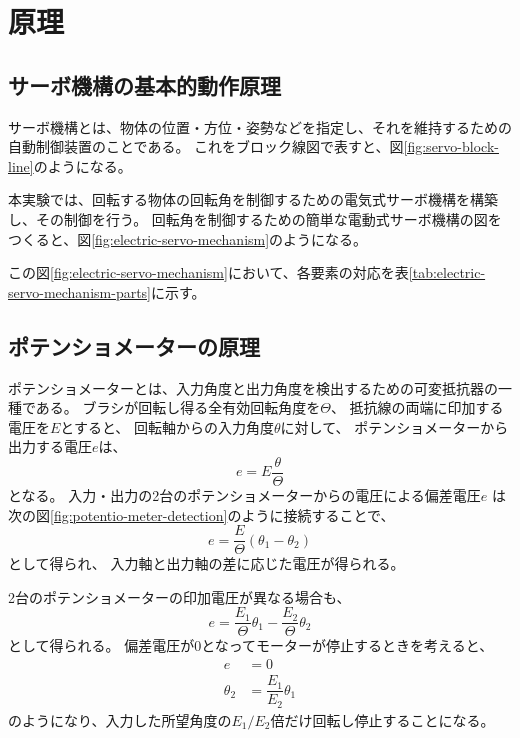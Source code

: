 \documentclass[../../../main]{subfiles}
\begin{document}
\section{原理}\label{sec:principle}

\subsection{サーボ機構の基本的動作原理}

サーボ機構とは、物体の位置・方位・姿勢などを指定し、それを維持するための自動制御装置のことである。
これをブロック線図で表すと、図\ref{fig:servo-block-line}のようになる。

本実験では、回転する物体の回転角を制御するための電気式サーボ機構を構築し、その制御を行う。
回転角を制御するための簡単な電動式サーボ機構の図をつくると、図\ref{fig:electric-servo-mechanism}のようになる。

この図\ref{fig:electric-servo-mechanism}において、各要素の対応を表\ref{tab:electric-servo-mechanism-parts}に示す。



\subsection{ポテンショメーターの原理}
ポテンショメーターとは、入力角度と出力角度を検出するための可変抵抗器の一種である。
ブラシが回転し得る全有効回転角度を$\Theta$、
抵抗線の両端に印加する電圧を$E$とすると、
回転軸からの入力角度$\theta$に対して、
ポテンショメーターから出力する電圧$e$は、
\begin{equation}\label{eq:potentiometer}
	e = E \frac{\theta}{\Theta}
\end{equation}
となる。
入力・出力の2台のポテンショメーターからの電圧による偏差電圧$e$
は次の図\ref{fig:potentio-meter-detection}のように接続することで、
\begin{equation}
	e = \dfrac{E}{\Theta} (\theta_1 - \theta_2)
\end{equation}
として得られ、
入力軸と出力軸の差に応じた電圧が得られる。


2台のポテンショメーターの印加電圧が異なる場合も、
\begin{equation}
	e = \dfrac{E_1}{\Theta} \theta_1 - \dfrac{E_2}{\Theta} \theta_2
\end{equation}
として得られる。
偏差電圧が0となってモーターが停止するときを考えると、
\begin{align*}
	e        & = 0                         \\
	\theta_2 & = \dfrac{E_1}{E_2} \theta_1
\end{align*}
のようになり、入力した所望角度の$E_1/E_2$倍だけ回転し停止することになる。
\end{document}
